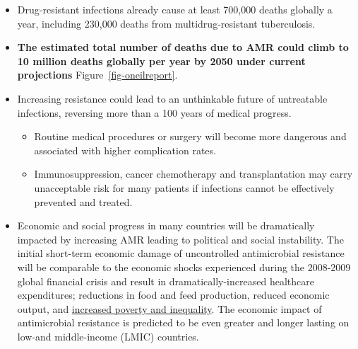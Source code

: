 \documentclass[
  letterpaper,
  DIV=11,
  numbers=noendperiod]{scrreprt}
\providecommand{\tightlist}{%
  \setlength{\itemsep}{0pt}\setlength{\parskip}{0pt}}\usepackage{longtable,booktabs,array}
\begin{document}
\begin{itemize}
\tightlist
\item
  Drug-resistant infections already cause at least 700,000 deaths
  globally a year, including 230,000 deaths from multidrug-resistant
  tuberculosis.
\item
  \textbf{The estimated total number of deaths due to AMR could climb to
  10 million deaths globally per year by 2050 under current projections}
  Figure~\ref{fig-oneilreport}.
\item
  Increasing resistance could lead to an unthinkable future of
  untreatable infections, reversing more than a 100 years of medical
  progress.

  \begin{itemize}
  \item
    Routine medical procedures or surgery will become more dangerous and
    associated with higher complication rates.
  \item
    Immunosuppression, cancer chemotherapy and transplantation may carry
    unacceptable risk for many patients if infections cannot be
    effectively prevented and treated.
  \end{itemize}
\item
  Economic and social progress in many countries will be dramatically
  impacted by increasing AMR leading to political and social
  instability. The initial short-term economic damage of uncontrolled
  antimicrobial resistance will be comparable to the economic shocks
  experienced during the 2008-2009 global financial crisis and result in
  dramatically-increased healthcare expenditures; reductions in food and
  feed production, reduced economic output, and
  \href{https://documents.worldbank.org/en/publication/documents-reports/documentdetail/323311493396993758/final-report}{increased
  poverty and inequality}. The economic impact of antimicrobial
  resistance is predicted to be even greater and longer lasting on
  low-and middle-income (LMIC) countries.
\end{itemize}
\end{document}
